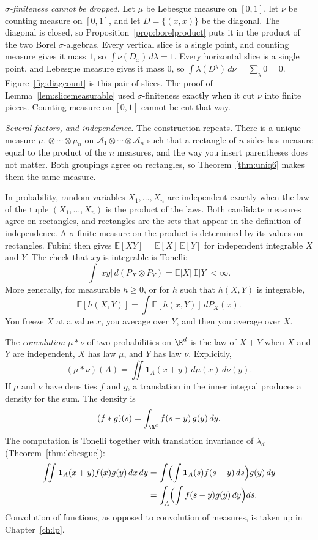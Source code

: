 \emph{$\sigma$-finiteness cannot be dropped.} Let $\mu$ be Lebesgue measure on $[0,1]$, let $\nu$ be counting measure on $[0,1]$, and let $D=\{(x,x)\}$ be the diagonal. The diagonal is closed, so Proposition~\ref{prop:borelproduct} puts it in the product of the two Borel $\sigma$-algebras. Every vertical slice is a single point, and counting measure gives it mass $1$, so $\int\nu(D_x)\,d\lambda=1$. Every horizontal slice is a single point, and Lebesgue measure gives it mass $0$, so $\int\lambda(D^y)\,d\nu=\sum_y 0=0$. Figure~\ref{fig:diagcount} is this pair of slices. The proof of Lemma~\ref{lem:slicemeasurable} used $\sigma$-finiteness exactly when it cut $\nu$ into finite pieces. Counting measure on $[0,1]$ cannot be cut that way.

\emph{Several factors, and independence.} The construction repeats. There is a unique measure $\mu_1\otimes\cdots\otimes\mu_n$ on $\mathcal A_1\otimes\cdots\otimes\mathcal A_n$ such that a rectangle of $n$ sides has measure equal to the product of the $n$ measures, and the way you insert parentheses does not matter. Both groupings agree on rectangles, so Theorem~\ref{thm:uniq6} makes them the same measure.

In probability, random variables $X_1,\dots,X_n$ are independent exactly when the law of the tuple $(X_1,\dots,X_n)$ is the product of the laws. Both candidate measures agree on rectangles, and rectangles are the sets that appear in the definition of independence. A $\sigma$-finite measure on the product is determined by its values on rectangles. Fubini then gives $\mathbb E[XY]=\mathbb E[X]\,\mathbb E[Y]$ for independent integrable $X$ and $Y$. The check that $xy$ is integrable is Tonelli:
\[
\int|xy|\,d(P_X\otimes P_Y)=\mathbb E|X|\,\mathbb E|Y|<\infty.
\]
More generally, for measurable $h\ge 0$, or for $h$ such that $h(X,Y)$ is integrable,
\[\mathbb E[h(X,Y)]=\int\mathbb E[h(x,Y)]\,dP_X(x).\]
You freeze $X$ at a value $x$, you average over $Y$, and then you average over $X$.

The \emph{convolution} $\mu*\nu$ of two probabilities on $\R^d$ is the law of $X+Y$ when $X$ and $Y$ are independent, $X$ has law $\mu$, and $Y$ has law $\nu$. Explicitly,
\[
(\mu*\nu)(A)=\iint\mathbf 1_A(x+y)\,d\mu(x)\,d\nu(y).
\]
If $\mu$ and $\nu$ have densities $f$ and $g$, a translation in the inner integral produces a density for the sum. The density is
\[(f*g)(s)=\int_{\R^d}f(s-y)\,g(y)\,dy.\]
The computation is Tonelli together with translation invariance of $\lambda_d$ (Theorem~\ref{thm:lebesgue}):
\[\begin{aligned}
\iint\mathbf 1_A(x+y)f(x)g(y)\,dx\,dy
&=\int\Bigl(\int\mathbf 1_A(s)f(s-y)\,ds\Bigr)g(y)\,dy\\
&=\int_A\Bigl(\int f(s-y)g(y)\,dy\Bigr)ds.
\end{aligned}\]
Convolution of functions, as opposed to convolution of measures, is taken up in Chapter~\ref{ch:lp}.

